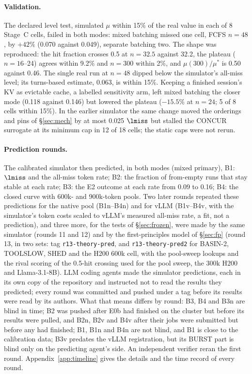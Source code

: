 \paragraph{Validation.} The declared level test, simulated $\mu$ within 15\% of the real value in each of 8 Stage~C cells, failed in both modes: mixed batching missed one cell, FCFS $n=48$, by $+42\%$ (0.070 against 0.049\sps), separate batching two. The shape was reproduced: the hit fraction crosses 0.5 at $n=32.5$ against 32.2, the plateau ($n=16$--24) agrees within 9.2\% and $n=300$ within 2\%, and $\mu(300)/\mu^*$ is 0.50 against 0.46. The single real run at $n=48$ dipped below the simulator's all-miss level; its turns-based estimate, 0.063\sps, is within 15\%. Keeping a finished session's KV as evictable cache, a labelled sensitivity arm, left mixed batching the closer mode (0.118 against 0.146) but lowered the plateau ($-15.5\%$ at $n=24$; 5 of 8 cells within 15\%). In the earlier simulator the same change moved the orderings and pins of \S\ref{sec:mech} by at most 0.025 $\lmiss$ but stalled the CONCUR surrogate at its minimum cap in 12 of 18 cells; the static caps were not rerun.

\paragraph{Prediction rounds.} The calibrated simulator then predicted, in both modes (mixed primary), B1: $\lmiss$ and the all-miss token rate; B2: the fraction of from-empty runs that stay stable at each rate; B3: the E2 outcome at each rate from 0.09 to 0.16\sps; B4: the closed curve with 600k- and 900k-token pools. Two later rounds repeated these predictions for the native pool (B1n--B4n) and for vLLM (B1v--B4v, with the simulator's token costs scaled to vLLM's measured all-miss rate, a fit, not a prediction), and three more, for the tests of \S\ref{sec:frozen}, were made by the same simulator (rounds 11 and 12) and by the first-principles model of \S\ref{sec:fp} (round 13, in two sets: tag \texttt{r13-theory-pred}, and \texttt{r13-theory-pred2} for BASIN-2, TOOLSLOW, SHED and the H200 600k cell, with the pool-sweep lookups and the rival scoring of the 0.5-hit crossing used for the pool sweep, the 300k H200 and Llama-3.1-8B). LLM coding agents made the simulator predictions, each in its own copy of the repository and instructed not to read the results they predicted; every round was committed and pushed under a tag before its results were read by its authors. What that means differs by round: B3, B4 and B3n are blind in time; B2 was pushed after E0b had finished on the cluster but before its results were pulled, and B2n, B2v and B4v after their jobs were submitted but before any had finished; B1, B1n and B4n are not blind, and B1 is close to the calibration data; B3v predates the vLLM registration, but its BURST part is blind only on the predicting agent's side. An independent verifier reran the first round. Appendix~\ref{app:timeline} gives the details and the time record of every round.

